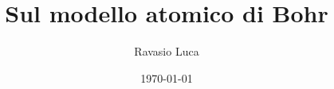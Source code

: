 \documentclass[8pt]{extarticle}
\title{Sul modello atomico di Bohr}
\author{Ravasio Luca}
\date{\today}
\begin{document}
\maketitle

\nocite{*}
\printbibliography
\end{document}
